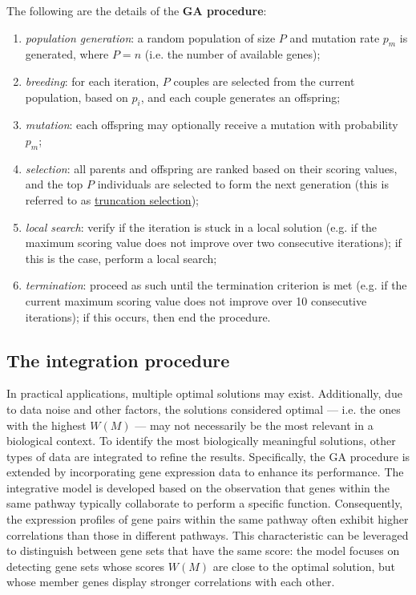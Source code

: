 \begin{definition}[GA procedure]
    The following are the details of the \textbf{GA procedure}:

    \begin{enumerate}
        \item \textit{population generation}: a random population of size $P$ and mutation rate $p_m$ is generated, where $P = n$ (i.e. the number of available genes);
        \item \textit{breeding}: for each iteration, $P$ couples are selected from the current population, based on $p_i$, and each couple generates an offspring;
        \item \textit{mutation}: each offspring may optionally receive a mutation with probability $p_m$;
        \item \textit{selection}: all parents and offspring are ranked based on their scoring values, and the top $P$ individuals are selected to form the next generation (this is referred to as \href{https://en.wikipedia.org/wiki/Truncation_selection}{truncation selection});
        \item \textit{local search}: verify if the iteration is stuck in a local solution (e.g. if the maximum scoring value does not improve over two consecutive iterations); if this is the case, perform a local search;
        \item \textit{termination}: proceed as such until the termination criterion is met (e.g. if the current maximum scoring value does not improve over 10 consecutive iterations); if this occurs, then end the procedure.
    \end{enumerate}
\end{definition}

\subsection{The integration procedure}

In practical applications, multiple optimal solutions may exist. Additionally, due to data noise and other factors, the solutions considered optimal --- i.e. the ones with the highest $W(M)$ --- may not necessarily be the most relevant in a biological context. To identify the most biologically meaningful solutions, other types of data are integrated to refine the results. Specifically, the GA procedure is extended by incorporating gene expression data to enhance its performance. The integrative model is developed based on the observation that genes within the same pathway typically collaborate to perform a specific function. Consequently, the expression profiles of gene pairs within the same pathway often exhibit higher correlations than those in different pathways. This characteristic can be leveraged to distinguish between gene sets that have the same score: the model focuses on detecting gene sets whose scores $W(M)$ are close to the optimal solution, but whose member genes display stronger correlations with each other.


